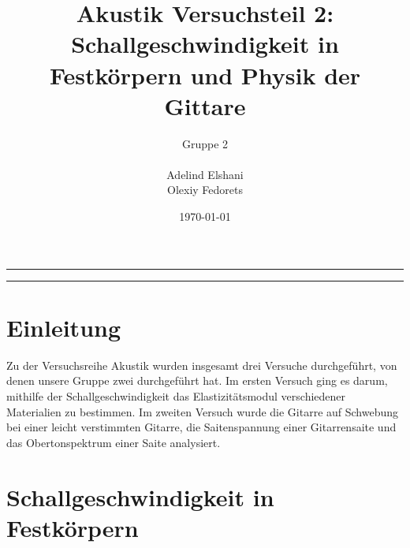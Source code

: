 \documentclass[a4paper, 11pt]{article}
\title{Akustik Versuchsteil 2: \\ Schallgeschwindigkeit in Festkörpern und Physik der Gittare}
\author{Gruppe 2 \\ \\ Adelind Elshani \\ Olexiy Fedorets}
\date{\today}
\begin{document}
\begin{titlepage}
	\vspace*{\fill}
	\begin{center}
		\textheight
		\vfill
		\newcommand{\Line}{\rule{\linewidth}{0.6mm}}
		\Line 
		{\let\newpage\relax\maketitle}
		\Line 
		\vfill
	\end{center}
	\vspace*{\fill}
	\thispagestyle{empty}
\end{titlepage}





\newpage
\thispagestyle{empty}
\tableofcontents
\newpage

\pagestyle{fancy}
\fancyhf{}
\fancyhead[L]{\nouppercase{\leftmark}}
\fancyhead[R]{\thepage}
\renewcommand{\headrulewidth}{0.5pt}
\fancyfoot[C]{\thepage}


\setcounter{page}{1}

\section{Einleitung}
Zu der Versuchsreihe Akustik wurden insgesamt drei Versuche durchgeführt, von denen unsere Gruppe zwei durchgeführt hat. Im ersten Versuch ging es darum, mithilfe der Schallgeschwindigkeit das Elastizitätsmodul verschiedener Materialien zu bestimmen. Im zweiten Versuch wurde die Gitarre auf Schwebung bei einer leicht verstimmten Gitarre, die Saitenspannung einer Gitarrensaite und das Obertonspektrum einer Saite analysiert. 

\section{Schallgeschwindigkeit in Festkörpern}
\end{document}

